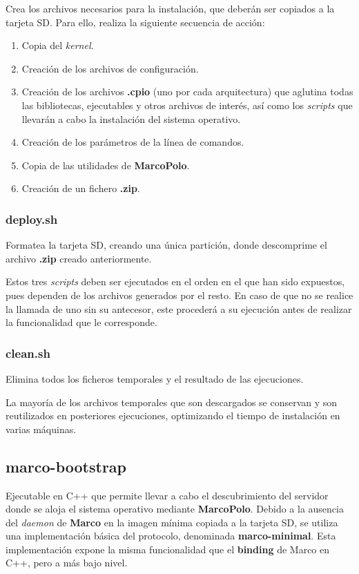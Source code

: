 \documentclass{article}
\begin{document}
Crea los archivos necesarios para la instalación, que deberán ser copiados a la tarjeta SD. Para ello, realiza la siguiente secuencia de acción:

\begin{enumerate}
\item Copia del \textit{kernel}.
\item Creación de los archivos de configuración.
\item Creación de los archivos \textbf{.cpio} (uno por cada arquitectura) que aglutina todas las bibliotecas, ejecutables y otros archivos de interés, así como los \textit{scripts} que llevarán a cabo la instalación del sistema operativo. 
\item Creación de los parámetros de la línea de comandos.
\item Copia de las utilidades de \textbf{MarcoPolo}.
\item Creación de un fichero \textbf{.zip}.
\end{enumerate}

\subsubsection*{deploy.sh}

Formatea la tarjeta SD, creando una única partición, donde descomprime el archivo \textbf{.zip} creado anteriormente.

Estos tres \textit{scripts} deben ser ejecutados en el orden en el que han sido expuestos, pues dependen de los archivos generados por el resto. En caso de que no se realice la llamada de uno sin su antecesor, este procederá a su ejecución antes de realizar la funcionalidad que le corresponde.

\subsubsection*{clean.sh}

Elimina todos los ficheros temporales y el resultado de las ejecuciones.

La mayoría de los archivos temporales que son descargados se conservan y son reutilizados en posteriores ejecuciones, optimizando el tiempo de instalación en varias máquinas.

\subsection{marco-bootstrap}

Ejecutable en C++ que permite llevar a cabo el descubrimiento del servidor donde se aloja el sistema operativo mediante \textbf{MarcoPolo}. Debido a la ausencia del \textit{daemon} de \textbf{Marco} en la imagen mínima copiada a la tarjeta SD, se utiliza una implementación básica del protocolo, denominada \textbf{marco-minimal}. Esta implementación expone la misma funcionalidad que el \textbf{binding} de Marco en C++, pero a más bajo nivel.
\end{document}
